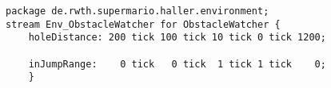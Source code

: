 \begin{lstlisting}[label=lst:holewatchertest, caption=Hole watcher stream test, morekeywords={package, stream, tick, for},
frame=single, basicstyle=\small]
package de.rwth.supermario.haller.environment;
stream Env_ObstacleWatcher for ObstacleWatcher {
    holeDistance: 200 tick 100 tick 10 tick 0 tick 1200;
    
    inJumpRange:    0 tick   0 tick  1 tick	1 tick    0;
    }
\end{lstlisting}